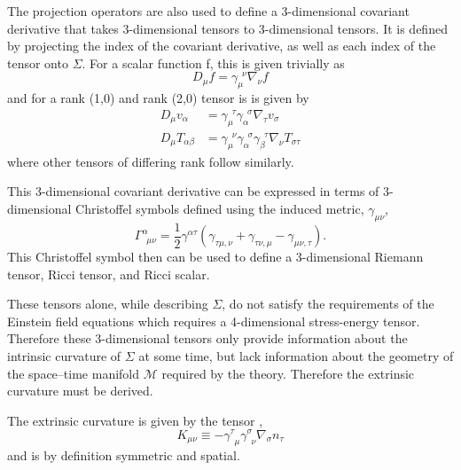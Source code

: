 \documentclass[11pt]{article}
\newcommand{\blank}{\enspace}
\numberwithin{equation}{section}
\begin{document}
The projection operators are also used to define a 3-dimensional covariant derivative that takes 3-dimensional tensors to 3-dimensional tensors. It is defined by projecting the index of the covariant derivative, as well as each index of the tensor onto $\Sigma$. For a scalar function f, this is given trivially as
\begin{equation}
    D_{\mu}f = \gamma_{\mu}^{\blank\nu} \nabla_{\nu}f
\end{equation}
and for a rank (1,0) and rank (2,0) tensor is is given by
\begin{align*}
    D_{\mu}v_{\alpha} &= \gamma_{\mu}^{\blank\tau} \gamma_{\alpha}^{\blank\sigma} \nabla_{\tau} v_{\sigma} \\
    D_{\mu}T_{\alpha\beta} &= \gamma_{\mu}^{\blank\nu} \gamma_{\alpha}^{\blank\sigma} \gamma_{\beta}^{\blank\tau} \nabla_{\nu} T_{\sigma\tau}
\end{align*}
where other tensors of differing rank follow similarly.

This 3-dimensional covariant derivative can be expressed in terms of 3-dimensional Christoffel symbols defined using the induced metric, $\gamma_{\mu\nu}$,
\begin{equation}
    \Gamma^{\alpha}_{\blank\mu\nu} = \frac12 \gamma^{\alpha\tau}\left(\gamma_{\tau\mu,\nu} + \gamma_{\tau\nu,\mu} - \gamma_{\mu\nu,\tau}\right).
\end{equation}
This Christoffel symbol then can be used to define a 3-dimensional Riemann tensor, Ricci tensor, and Ricci scalar. 

These tensors alone, while describing $\Sigma$, do not satisfy the requirements of the Einstein field equations which requires a 4-dimensional stress-energy tensor. Therefore these 3-dimensional tensors only provide information about the intrinsic curvature of $\Sigma$ at some time, but lack information about the geometry of the space--time manifold $\mathcal{M}$ required by the theory. Therefore the extrinsic curvature must be derived.  

The extrinsic curvature is given by the tensor \cite{baumgarte_shapiro_2010}, \cite{poisson}
\begin{equation}
    K_{\mu\nu} \equiv  - \gamma_{\blank\mu}^{\tau} \gamma_{\blank\nu}^{\sigma} \nabla_{\sigma}n_{\tau}
\end{equation}
and is by definition symmetric and spatial.
\end{document}
